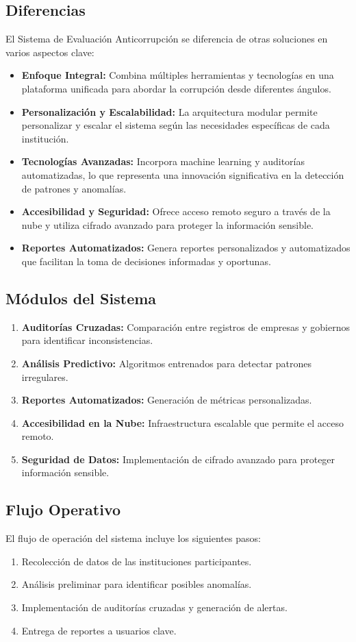 \documentclass[a4paper,12pt]{article}
\begin{document}
\subsection{Diferencias}
El Sistema de Evaluación Anticorrupción se diferencia de otras soluciones en varios aspectos clave:

\begin{itemize}
    \item \textbf{Enfoque Integral:} Combina múltiples herramientas y tecnologías en una plataforma unificada para abordar la corrupción desde diferentes ángulos.
    \item \textbf{Personalización y Escalabilidad:} La arquitectura modular permite personalizar y escalar el sistema según las necesidades específicas de cada institución.
    \item \textbf{Tecnologías Avanzadas:} Incorpora machine learning y auditorías automatizadas, lo que representa una innovación significativa en la detección de patrones y anomalías.
    \item \textbf{Accesibilidad y Seguridad:} Ofrece acceso remoto seguro a través de la nube y utiliza cifrado avanzado para proteger la información sensible.
    \item \textbf{Reportes Automatizados:} Genera reportes personalizados y automatizados que facilitan la toma de decisiones informadas y oportunas.
\end{itemize}

\subsection{Módulos del Sistema}
\begin{enumerate}
    \item \textbf{Auditorías Cruzadas:} Comparación entre registros de empresas y gobiernos para identificar inconsistencias.
    \item \textbf{Análisis Predictivo:} Algoritmos entrenados para detectar patrones irregulares.
    \item \textbf{Reportes Automatizados:} Generación de métricas personalizadas.
    \item \textbf{Accesibilidad en la Nube:} Infraestructura escalable que permite el acceso remoto.
    \item \textbf{Seguridad de Datos:} Implementación de cifrado avanzado para proteger información sensible.
\end{enumerate}

\subsection{Flujo Operativo}
El flujo de operación del sistema incluye los siguientes pasos:
\begin{enumerate}
    \item Recolección de datos de las instituciones participantes.
    \item Análisis preliminar para identificar posibles anomalías.
    \item Implementación de auditorías cruzadas y generación de alertas.
    \item Entrega de reportes a usuarios clave.
\end{enumerate}
\end{document}
